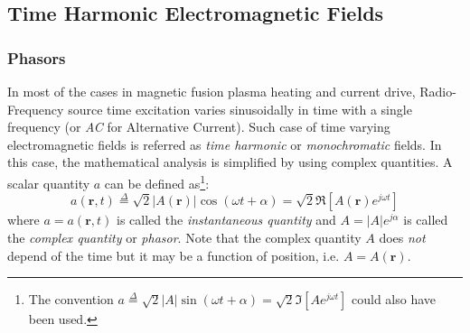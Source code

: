 \subsection{Time Harmonic Electromagnetic Fields}
\subsubsection{Phasors}
In most of the cases in magnetic fusion plasma heating and current drive, Radio-Frequency source time excitation varies sinusoidally in time with a single frequency (or \emph{AC} for Alternative Current). Such case of time varying electromagnetic fields is referred as \emph{time harmonic} or \emph{monochromatic} fields. In this case, the mathematical analysis is simplified by using complex quantities. A scalar quantity $a$ can be defined as\footnote{The convention $ a \stackrel{\Delta}{=} \sqrt{2} |A| \sin (\omega t + \alpha) = \sqrt{2} \Im\left[A e^{j \omega t} \right]$ could also have been used.}:
\begin{equation}
a(\mathbf{r},t)
\stackrel{\Delta}{=} 
\sqrt{2} |A(\mathbf{r})| \cos (\omega t + \alpha) = \sqrt{2} \Re\left[A(\mathbf{r}) e^{j \omega t} \right] \label{eq:phasor}
\end{equation}
where $a=a(\mathbf{r}, t)$ is called the \emph{instantaneous quantity} and $A=|A|e^{j\alpha}$ is called the \emph{complex quantity} or \emph{phasor}. Note that the complex quantity $A$ does \emph{not} depend of the time but it may be a function of position, i.e. $A=A(\mathbf{r})$. 


